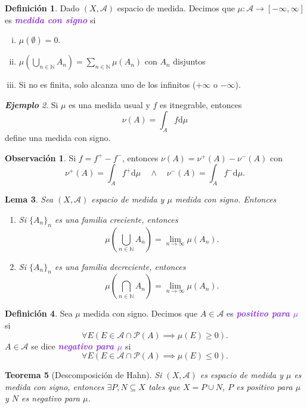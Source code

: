 \documentclass{article}
\newtheorem{theorem}{Teorema}[subsection]
\newtheorem{lemma}[theorem]{Lema}
\theoremstyle{definition}
\newtheorem{definition}[theorem]{Definición}
\newtheorem*{obs}{Observación}
\theoremstyle{remark}
\newtheorem{example}[theorem]{\textbf{Ejemplo}}
\numberwithin{equation}{section}
\newcommand{\A}{\mathcal{A}}
\newcommand{\N}{\mathbb{N}}
\renewcommand{\P}{\mathcal{P}}
\renewcommand{\d}{\mathrm{d}}
\newcommand{\oo}{\infty}
\newcommand{\br}[1]{\left( #1 \right)}
\newcommand{\wea}[1]{\textcolor{BlueViolet}{\textbf{\emph{#1}}}}
\begin{document}
\begin{definition}
  Dado $(X,\A)$ espacio de medida. Decimos que $\mu \colon \A \to [-\oo,\oo]$ es \wea{medida con signo} si
  \begin{enumerate}[(i)]
    \item $\mu(\emptyset) = 0$.
    \item $\mu\br{\bigcup_{n\in\N} A_n} = \sum_{n\in\N} \mu(A_n)$ con $A_n$ disjuntos
    \item Si no es finita, solo alcanza uno de los infinitos ($+\oo$ o $-\oo$).
  \end{enumerate}
\end{definition}

\begin{example}
  Si $\mu$ es una medida usual y $f$ es itnegrable, entonces
  \[ \nu(A) = \int_A f \d\mu \]
  define una medida con signo.
\end{example}

\begin{obs}
  Si $f = f^+ - f^-$, entonces $\nu(A) = \nu^+(A) - \nu^-(A)$ con
  \[ \nu^+(A) = \int_A f^+ \d\mu \quad\land\quad \nu^-(A) = \int_A f^- \d\mu. \]
\end{obs}

\begin{lemma}
  Sea $(X,\A)$ espacio de medida y $\mu$ medida con signo. Entonces
  \begin{enumerate}[(1)]
    \item Si $\{A_n\}_n$ es una familia creciente, entonces
    \[ \mu\br{\bigcup_{n\in\N} A_n} = \lim_{n\to\oo} \mu(A_n). \]
    \item Si $\{A_n\}_n$ es una familia decreciente, entonces
    \[ \mu\br{\bigcap_{n\in\N} A_n} = \lim_{n\to\oo} \mu(A_n). \]
  \end{enumerate}
\end{lemma}

\begin{definition}
  Sea $\mu$ medida con signo. Decimos que $A \in \A$ es \wea{positivo para $\mu$} si
  \[ \forall E(E \in \A \cap \P(A) \implies \mu(E) \geq 0). \]
  $A \in \A$ se dice \wea{negativo para $\mu$} si
  \[ \forall E (E \in \A \cap \P(A) \implies \mu(E) \leq 0). \]
\end{definition}

\begin{theorem}
  [Descomposición de Hahn]
  Si $(X,\A)$ es espacio de medida y $\mu$ es medida con signo, entonces $\exists P,N \subseteq X$ tales que $X = P \cup N$, $P$ es positivo para $\mu$ y $N$ es negativo para $\mu$.
\end{theorem}
\end{document}
